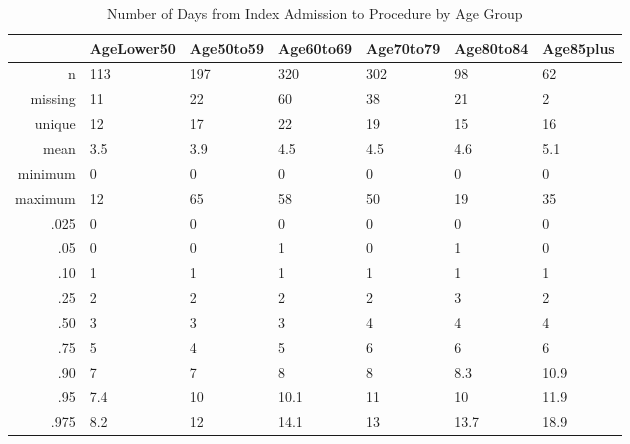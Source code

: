 \documentclass[a4paper]{report}
\begin{document}
\begin{itemize}
{%
\begin{table}[ht]
\centering
\begin{tabular}{rllllll}
  \toprule
 & AgeLower50 & Age50to59 & Age60to69 & Age70to79 & Age80to84 & Age85plus \\ 
  \midrule
n & 113 & 197 & 320 & 302 & 98 & 62 \\ 
  missing & 11 & 22 & 60 & 38 & 21 & 2 \\ 
  unique & 12 & 17 & 22 & 19 & 15 & 16 \\ 
  mean & 3.5 & 3.9 & 4.5 & 4.5 & 4.6 & 5.1 \\ 
  minimum & 0 & 0 & 0 & 0 & 0 & 0 \\ 
  maximum & 12 & 65 & 58 & 50 & 19 & 35 \\ 
  .025 & 0 & 0 & 0 & 0 & 0 & 0 \\ 
  .05 & 0 & 0 & 1 & 0 & 1 & 0 \\ 
  .10 & 1 & 1 & 1 & 1 & 1 & 1 \\ 
  .25 & 2 & 2 & 2 & 2 & 3 & 2 \\ 
  .50 & 3 & 3 & 3 & 4 & 4 & 4 \\ 
  .75 & 5 & 4 & 5 & 6 & 6 & 6 \\ 
  .90 & 7 & 7 & 8 & 8 & 8.3 & 10.9 \\ 
  .95 & 7.4 & 10 & 10.1 & 11 & 10 & 11.9 \\ 
  .975 & 8.2 & 12 & 14.1 & 13 & 13.7 & 18.9 \\ 
   \bottomrule
\end{tabular}
\caption{Number of Days from Index Admission to Procedure by Age Group} 
\end{table}

}
\end{itemize}
\end{document}
